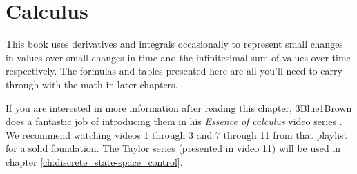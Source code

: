 
\chapter{Calculus}

This book uses derivatives and integrals occasionally to represent small changes
in values over small changes in time and the infinitesimal sum of values over
time respectively. The formulas and tables presented here are all you'll need to
carry through with the math in later chapters.

If you are interested in more information after reading this chapter,
3Blue1Brown does a fantastic job of introducing them in his \textit{Essence of
calculus} video series \cite{bib:essence_of_calculus}. We recommend watching
videos 1 through 3 and 7 through 11 from that playlist for a solid foundation.
The Taylor series (presented in video 11) will be used in chapter
\ref{ch:discrete_state-space_control}.

\renewcommand*{\chapterpath}{\partpath/calculus}




